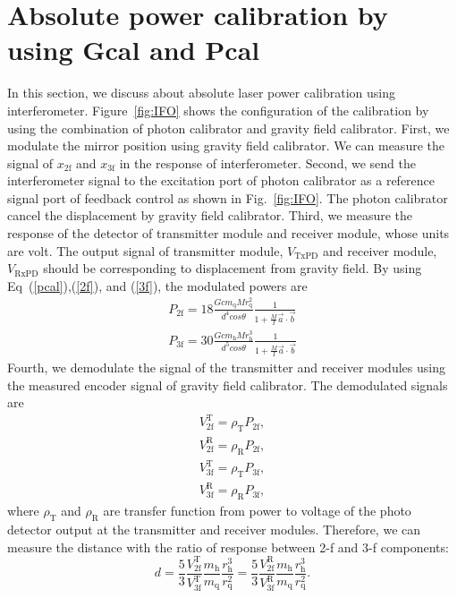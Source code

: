 \documentclass[A4]{spie}  %
\begin{document}
\section{Absolute power calibration by using Gcal and Pcal} \label{sec:PGCAL}
In this section, we discuss about absolute laser power calibration using interferometer. 
Figure~\ref{fig:IFO} shows the configuration of the calibration by using the combination of photon calibrator and gravity field calibrator.
First, we modulate the mirror position using gravity field calibrator. We can measure the signal of $x_{\mathrm{2f}}$ and $x_{\mathrm{3f}}$ in the response of interferometer. Second, we send the interferometer signal to the excitation port of photon calibrator as a reference signal port of feedback control as shown in Fig.~\ref{fig:IFO}. The photon calibrator cancel the displacement by gravity field calibrator. Third, we measure the response of the detector of transmitter module and receiver module, whose units are volt. The output signal of transmitter module, $V_{\mathrm{TxPD}}$ and receiver module, $V_{\mathrm{RxPD}}$ should be corresponding to displacement from gravity field. By using Eq~(\ref{pcal}),(\ref{2f}), and (\ref{3f}), the modulated powers are
\begin{eqnarray}
 P_{\mathrm{2f}}=18 \frac{Gcm_{\mathrm{q}}Mr_{\mathrm{q}}^2}{d^4cos\theta}\frac{1}{1+\frac{M}{I}\vec{a}\cdot \vec{b}} \label{P2f} \\
 P_{\mathrm{3f}}= 30\frac{Gcm_{\mathrm{h}}Mr_{\mathrm{h}}^3}{d^5cos\theta}\frac{1}{1+\frac{M}{I}\vec{a}\cdot \vec{b}} \label{P3f}
\end{eqnarray}
Fourth, we demodulate the signal of the transmitter and receiver modules using the measured encoder signal of gravity field calibrator.
The demodulated signals are 
\begin{eqnarray}
V_{\mathrm{2f}}^{\mathrm{T}}=\rho_{\mathrm{T}}P_{\mathrm{2f}}, \\
V_{\mathrm{2f}}^{\mathrm{R}}=\rho_{\mathrm{R}}P_{\mathrm{2f}}, \\
V_{\mathrm{3f}}^{\mathrm{T}}=\rho_{\mathrm{T}}P_{\mathrm{3f}}, \\
V_{\mathrm{3f}}^{\mathrm{R}}=\rho_{\mathrm{R}}P_{\mathrm{3f}}, 
\end{eqnarray} 
where $\rho_{\mathrm{T}}$ and $\rho_{\mathrm{R}}$ are transfer function from power to voltage of the photo detector output at the transmitter and receiver modules.
Therefore, we can measure the distance with the ratio of response between 2-f and 3-f components: 
\begin{equation}
d=\frac{5}{3} \frac{V_{\mathrm{2f}}^{\mathrm{T}}}{V_{\mathrm{3f}}^{\mathrm{T}}}\frac{m_{\mathrm{h}}}{m_{\mathrm{q}}}\frac{r_{\mathrm{h}}^{3}}{r_{\mathrm{q}}^{2}}=\frac{5}{3} \frac{V_{\mathrm{2f}}^{\mathrm{R}}}{V_{\mathrm{3f}}^{\mathrm{R}}} \frac{m_{\mathrm{h}}}{m_{\mathrm{q}}}\frac{r_{\mathrm{h}}^{3}}{r_{\mathrm{q}}^{2}}. \label{d}
\end{equation}
\end{document}
